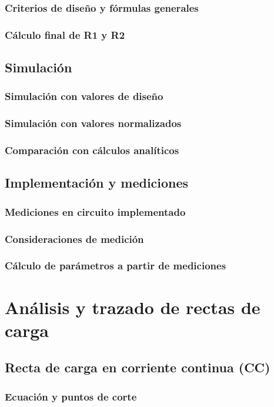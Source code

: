 \documentclass[chaptersright]{informeutn}
\begin{document}
    \subsection{Criterios de diseño y fórmulas generales}
    \subsection{Cálculo final de R1 y R2}
  \section{Simulación}
    \subsection{Simulación con valores de diseño}
    \subsection{Simulación con valores normalizados}
    \subsection{Comparación con cálculos analíticos}
  \section{Implementación y mediciones}
    \subsection{Mediciones en circuito implementado}
    \subsection{Consideraciones de medición}
    \subsection{Cálculo de parámetros a partir de mediciones}

\chapter{Análisis y trazado de rectas de carga}
  \section{Recta de carga en corriente continua (CC)}
    \subsection{Ecuación y puntos de corte}
\end{document}

